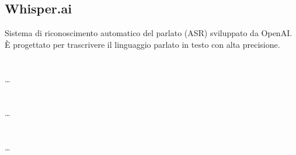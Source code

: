 \hypertarget{sec:whisper.ai}{}
\subsection*{Whisper.ai}
Sistema di riconoscimento automatico del parlato (ASR) sviluppato da OpenAI.
È progettato per trascrivere il linguaggio parlato in testo con alta precisione.

\newpage



\section{}

\dots

\newpage



\section{}

\dots

\newpage



\section{}

\dots
